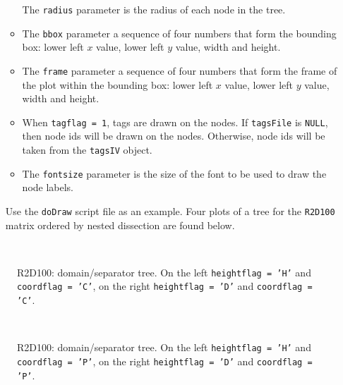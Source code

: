 \begin{enumerate}
\begin{itemize}
The {\tt radius} parameter is the radius of each node in the tree.
\item
The {\tt bbox} parameter a sequence of four numbers that form the
bounding box: 
lower left $x$ value,
lower left $y$ value,
width and height.
\item
The {\tt frame} parameter a sequence of four numbers that form the
frame of the plot within the bounding box: 
lower left $x$ value,
lower left $y$ value,
width and height.
\item
When {\tt tagflag = 1}, tags are drawn on the nodes.
If {\tt tagsFile} is {\tt NULL}, then node ids will be drawn on the
nodes.
Otherwise, node ids will be taken from the {\tt tagsIV} object.
\item
The {\tt fontsize} parameter is the size of the font to be used to
draw the node labels.
\end{itemize}
Use the {\tt doDraw} script file as an example.
Four plots of a tree for the {\tt R2D100} matrix ordered by nested
dissection are found below.
\end{enumerate}
\par
\begin{figure}[htbp]
\caption{{\sc R2D100}: domain/separator tree. 
         On the left {\tt heightflag = 'H'} and {\tt coordflag = 'C'},
         on the right {\tt heightflag = 'D'} and {\tt coordflag = 'C'}.}
\label{fig-R2D100-tree-HC}
\begin{center}
\mbox{
}
\mbox{
}
\end{center}
\end{figure}
\par

\begin{figure}[htbp]
\caption{{\sc R2D100}: domain/separator tree. 
         On the left {\tt heightflag = 'H'} and {\tt coordflag = 'P'},
         on the right {\tt heightflag = 'D'} and {\tt coordflag = 'P'}.}
\label{fig-R2D100-tree-HP}
\begin{center}
\mbox{
}
\mbox{
}
\end{center}
\end{figure}

